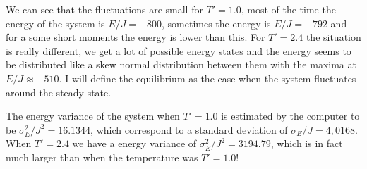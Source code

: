 \documentclass[norsk,a4paper,12pt]{article}
\begin{document}
\newline We can see that the fluctuations are small for $T'=1.0$, most of the time the energy of the system is $E/J=-800$, sometimes the energy is $E/J=-792$ and for a some short moments the energy is lower than this. For $T'=2.4$ the situation is really different, we get a lot of possible energy states and the energy seems to be distributed like a skew normal distribution between them with the maxima at $E/J\approx -510$. I will define the equilibrium as the case when the system fluctuates around the steady state.\par\vspace{5mm}

The energy variance of the system when $T'=1.0$ is estimated by the computer to be $\sigma_E^2/J^2=16.1344$, which correspond to a standard deviation of $\sigma_E/J=4,0168$. When $T'=2.4$ we have a energy variance of $\sigma_E^2/J^2=3194.79$, which is in fact much larger than when the temperature was $T'=1.0$!
\end{document}
